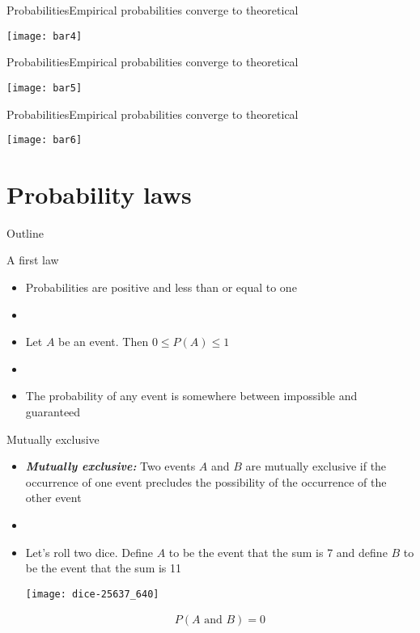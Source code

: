 \documentclass[xcolor=dvipsnames]{beamer}
\begin{document}
\begin{frame}{Probabilities}{Empirical probabilities converge to theoretical}
\begin{center}
	\texttt{[image: bar4]}
\end{center}
\end{frame}

\begin{frame}{Probabilities}{Empirical probabilities converge to theoretical}
\begin{center}
	\texttt{[image: bar5]}
\end{center}
\end{frame}

\begin{frame}{Probabilities}{Empirical probabilities converge to theoretical}
\begin{center}
	\texttt{[image: bar6]}
\end{center}
\end{frame}

\section{Probability laws}
\begin{frame}{Outline}
\tableofcontents[currentsection,subsectionstyle=show/shaded/hide]
\end{frame}

\begin{frame}{A first law}
	\begin{itemize}
		\item Probabilities are positive and less than or equal to one
		\item[]
		\item Let $A$ be an event. Then $0 \leq P(A) \leq 1$
		\item[]
		\item The probability of any event is somewhere between impossible and guaranteed
	\end{itemize}
\end{frame}

\begin{frame}{Mutually exclusive}
	\begin{itemize}
		\item \textbf{\emph{Mutually exclusive:}} Two events $A$ and $B$ are mutually exclusive if the occurrence of one event precludes the possibility of the occurrence of the other event
		\item[]
		\item Let's roll two dice. Define $A$ to be the event that the sum is 7 and define $B$ to be the event that the sum is 11
		\begin{center}
			\texttt{[image: dice-25637\_640]}
		\end{center}
		\begin{gather*}
			P(A \text{ and } B) = 0
		\end{gather*}
	\end{itemize}
\end{frame}
\end{document}
